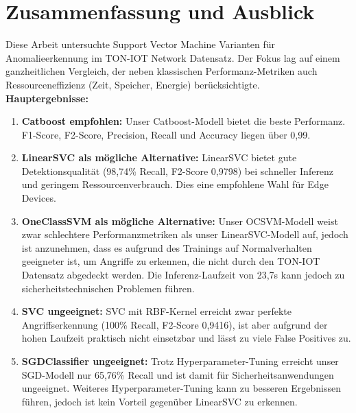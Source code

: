 \documentclass[12pt,oneside]{article}
\begin{document}
	\section{Zusammenfassung und Ausblick}
	\label{sec:conclusion}
	Diese Arbeit untersuchte  Support Vector Machine Varianten für Anomalieerkennung im TON-IOT Network Datensatz. Der Fokus lag auf einem ganzheitlichen Vergleich, der neben klassischen Performanz-Metriken auch Ressourceneffizienz (Zeit, Speicher, Energie) berücksichtigte.\\
	\textbf{Hauptergebnisse:}
	\begin{enumerate}
		\item \textbf{Catboost empfohlen:} Unser Catboost-Modell bietet die beste Performanz. F1-Score, F2-Score, Precision, Recall und Accuracy liegen über 0,99.
		
		\item \textbf{LinearSVC als mögliche Alternative:} LinearSVC bietet gute Detektionsqualität (98,74\% Recall, F2-Score 0,9798) bei schneller Inferenz und geringem Ressourcenverbrauch. Dies eine empfohlene Wahl für Edge Devices.
		
		\item \textbf{OneClassSVM als mögliche Alternative:} Unser OCSVM-Modell weist zwar schlechtere Performanzmetriken als unser LinearSVC-Modell auf, jedoch ist anzunehmen, dass es aufgrund des Trainings auf Normalverhalten geeigneter ist, um Angriffe zu erkennen, die nicht durch den TON-IOT Datensatz abgedeckt werden. Die Inferenz-Laufzeit von 23,7s kann jedoch zu sicherheitstechnischen Problemen führen.
		
		\item \textbf{SVC ungeeignet:} SVC mit RBF-Kernel erreicht zwar perfekte Angriffserkennung (100\% Recall, F2-Score 0,9416), ist aber aufgrund der hohen Laufzeit praktisch nicht einsetzbar und lässt zu viele False Positives zu.
		
		\item \textbf{SGDClassifier ungeeignet:} Trotz Hyperparameter-Tuning erreicht unser SGD-Modell nur 65,76\% Recall und ist damit für Sicherheitsanwendungen ungeeignet. Weiteres Hyperparameter-Tuning kann zu besseren Ergebnissen führen, jedoch ist kein Vorteil gegenüber LinearSVC zu erkennen.

	\end{enumerate}
	
	
	\clearpage %
	
	
	
	
	
\end{document}
